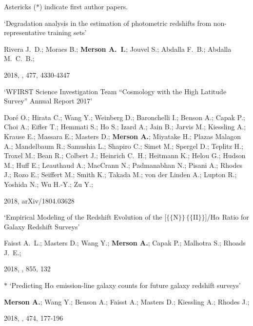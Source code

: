 Astericks ($\ast$) indicate first author papers.


\begin{etaremune}[leftmargin=15pt]
\item \label{itm:Rivera2018} `Degradation analysis in the estimation of photometric redshifts from non-representative training sets'\newline
  \begin{small}Rivera J.~D.; Moraes B.; \textbf{Merson A.~I.}; Jouvel S.; Abdalla F.~B.; Abdalla M.~C.~B.;\end{small} 2018, \mnras, 477, 4330-4347

\item \label{itm:Dor{\'e}2018} `WFIRST Science Investigation Team ``Cosmology with the High Latitude Survey'' Annual Report 2017'\newline
  \begin{small}Dor{\'e} O.; Hirata C.; Wang Y.; Weinberg D.; Baronchelli I.; Benson A.; Capak P.; Choi A.; Eifler T.; Hemmati S.; Ho S.; Izard A.; Jain B.; Jarvis M.; Kiessling A.; Krause E.; Massara E.; Masters D.; \textbf{Merson A.}; Miyatake H.; Plazas Malagon A.; Mandelbaum R.; Samushia L.; Shapiro C.; Simet M.; Spergel D.; Teplitz H.; Troxel M.; Bean R.; Colbert J.; Heinrich C.~H.; Heitmann K.; Helou G.; Hudson M.; Huff E.; Leauthaud A.; MacCrann N.; Padmanabhan N.; Pisani A.; Rhodes J.; Rozo E.; Seiffert M.; Smith K.; Takada M.; von der Linden A.; Lupton R.; Yoshida N.; Wu H.-Y.; Zu Y.;\end{small} 2018, arXiv/1804.03628

\item \label{itm:Faisst2018} `Empirical Modeling of the Redshift Evolution of the [$\{$\rm$\{$N$\}$$\}$\,$\{$\rm$\{$II$\}$$\}$]/H{$\alpha$} Ratio for Galaxy Redshift Surveys'\newline
  \begin{small}Faisst A.~L.; Masters D.; Wang Y.; \textbf{Merson A.}; Capak P.; Malhotra S.; Rhoads J.~E.;\end{small} 2018, \apj, 855, 132

\item \label{itm:Merson2018}{\Large $\ast$} `Predicting H{$\alpha$} emission-line galaxy counts for future galaxy redshift surveys'\newline
  \begin{small}\textbf{Merson A.}; Wang Y.; Benson A.; Faisst A.; Masters D.; Kiessling A.; Rhodes J.;\end{small} 2018, \mnras, 474, 177-196


\end{etaremune}
